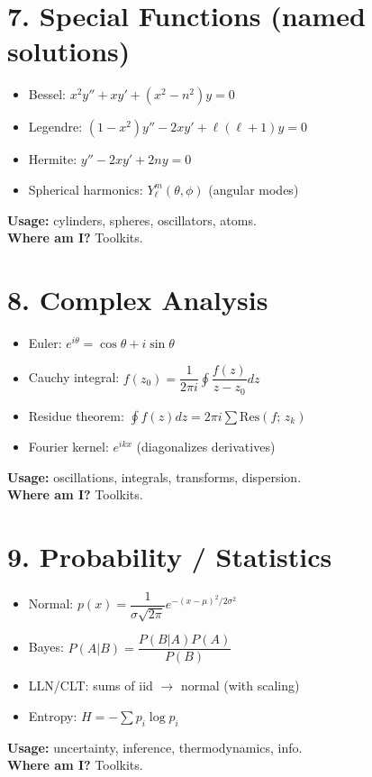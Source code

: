 \documentclass[12pt]{article}
\newcommand{\usage}[1]{\textbf{Usage:} #1}
\newcommand{\where}[1]{\textbf{Where am I?} #1}
\begin{document}
\newpage
\section*{7. Special Functions (named solutions)}
\begin{itemize}
  \item Bessel: \(x^2 y'' + x y' + (x^2-n^2) y=0\)
  \item Legendre: \((1-x^2) y'' - 2x y' + \ell(\ell+1) y=0\)
  \item Hermite: \(y'' - 2x y' + 2n y=0\)
  \item Spherical harmonics: \(Y_\ell^{m}(\theta,\phi)\) (angular modes)
\end{itemize}
\usage{cylinders, spheres, oscillators, atoms.}\\
\where{Toolkits.}

\newpage
\section*{8. Complex Analysis}
\begin{itemize}
  \item Euler: \(e^{i\theta}=\cos\theta + i\sin\theta\)
  \item Cauchy integral: \(f(z_0)=\dfrac{1}{2\pi i}\oint \dfrac{f(z)}{z-z_0}dz\)
  \item Residue theorem: \(\oint f(z)dz=2\pi i \sum \mathrm{Res}(f;\,z_k)\)
  \item Fourier kernel: \(e^{ikx}\) (diagonalizes derivatives)
\end{itemize}
\usage{oscillations, integrals, transforms, dispersion.}\\
\where{Toolkits.}

\newpage
\section*{9. Probability / Statistics}
\begin{itemize}
  \item Normal: \(p(x)=\dfrac{1}{\sigma\sqrt{2\pi}}e^{-(x-\mu)^2/2\sigma^2}\)
  \item Bayes: \(P(A|B)=\dfrac{P(B|A)P(A)}{P(B)}\)
  \item LLN/CLT: sums of iid \(\to\) normal (with scaling)
  \item Entropy: \(H=-\sum p_i \log p_i\)
\end{itemize}
\usage{uncertainty, inference, thermodynamics, info.}\\
\where{Toolkits.}
\end{document}
